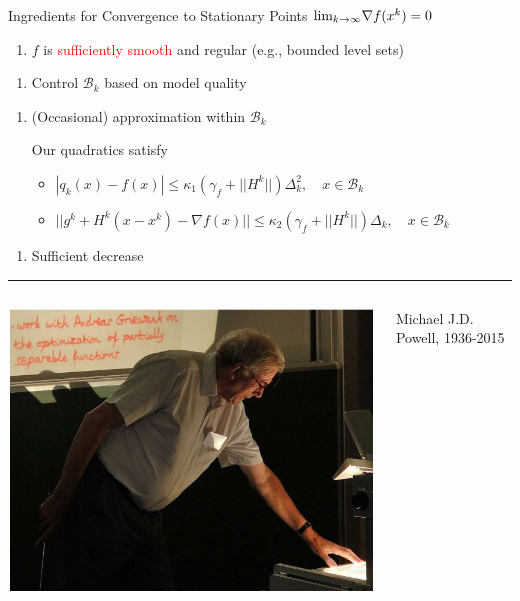 \documentclass[handout,aspectratio=54]{beamer}
\numberwithin{theorem}{section}
\begin{document}
\begin{frame}{Ingredients for Convergence to Stationary Points}
\footnotesize
\colorbox[rgb]{0.5,0.6,0.7}{\textcolor{white}{$\textup{lim}_{k\rightarrow\infty}\nabla f(x^k)=0$  provided:}}
\begin{enumerate}[0]
\item $f$ is \textcolor{red}{sufficiently smooth} and regular (e.g., bounded level sets)
\end{enumerate}
\begin{enumerate}[1]
\item Control $\mathcal{B}_k$ based on model quality
\end{enumerate}
\begin{enumerate}[2]
\item  (Occasional) approximation within $\mathcal{B}_k$

Our quadratics satisfy
	\begin{itemize}
	\item $|q_k(x)-f(x)|\le\kappa_1(\gamma_f+||H^k||)\Delta_k^2,\quad x\in\mathcal{B}_k$
	\item $||g^k+H^k(x-x^k)-\nabla f(x)||\le\kappa_2(\gamma_f+||H^k||)\Delta_k,\quad x\in\mathcal{B}_k$
	\end{itemize}
\end{enumerate}
\begin{enumerate}[3]
\item Sufficient decrease
\end{enumerate}

\rule{\textwidth}{1pt}

\begin{columns}
\tiny
{}
\includegraphics[width=\textwidth]{fig/30.jpg}
\begin{center}
Michael J.D. Powell, 1936-2015
\end{center}


\end{columns}
\end{frame}
\end{document}
